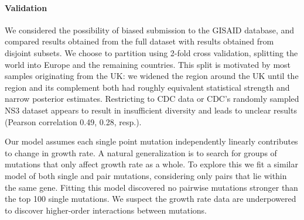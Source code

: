 \documentclass[12pt]{article}
\begin{document}
\paragraph*{Validation}

We considered the possibility of biased submission to the GISAID database, and compared results obtained from the full dataset with results obtained from disjoint subsets.
We choose to partition using 2-fold cross validation, splitting the world into Europe and the remaining countries.
This split is motivated by most samples originating from the UK: we widened the region around the UK until the region and its complement both had roughly equivalent statistical strength and narrow posterior estimates.
Restricting to CDC data or CDC's randomly sampled NS3 dataset appears to result in insufficient diversity and leads to unclear results (Pearson correlation 0.49, 0.28, resp.).

Our model assumes each single point mutation independently linearly contributes to change in growth rate.
A natural generalization is to search for groups of mutations that only affect growth rate as a whole.
To explore this we fit a similar model of both single and pair mutations, considering only pairs that lie within the same gene.
Fitting this model discovered no pairwise mutations stronger than the top 100 single mutations.
We suspect the growth rate data are underpowered to discover higher-order interactions between mutations.




\end{document}
